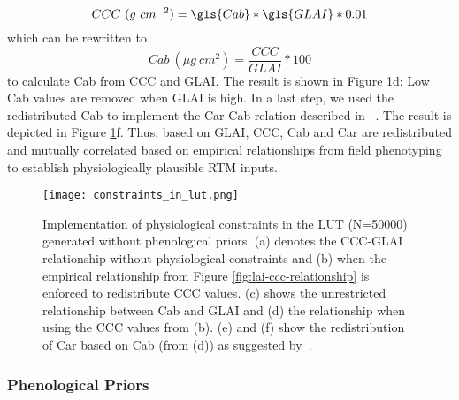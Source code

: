 \begin{equation}
\label{eq:ccc-calc-rtm}
    CCC\ (g\ cm^{-2}) = \gls{Cab} * \gls{GLAI} * 0.01
\end{equation}
which can be rewritten to
\begin{equation}
\label{eq:ccc-calc-rtm_inv}
    Cab\ (\mu g\ cm^{2}) = \frac{CCC}{GLAI} * 100
\end{equation}
to calculate \gls{Cab} from \gls{CCC} and GLAI. The result is shown in Figure \ref{fig:constraints-in-lut}d: Low \gls{Cab} values are removed when \gls{GLAI} is high. In a last step, we used the redistributed \gls{Cab} to implement the Car-Cab relation described in ~\cite{wocher_rtm-based_2020}. The result is depicted in Figure \ref{fig:constraints-in-lut}f. Thus, based on GLAI, CCC, \gls{Cab} and Car are redistributed and mutually correlated based on empirical relationships from field phenotyping to establish physiologically plausible \gls{RTM} inputs.

\begin{figure}[H]
    \centering
    \texttt{[image: constraints\_in\_lut.png]}
    \caption[Implementation of physiological constraints in the \gls{LUT} (N=50000) generated without phenological priors. (a) denotes the CCC-GLAI relationship without physiological constraints and (b) when the empirical relationship from Figure \ref{fig:lai-ccc-relationship} is enforced to redistribute \gls{CCC} values. (c) shows the unrestricted relationship between \gls{Cab} and \gls{GLAI} and (d) the relationship when using the \gls{CCC} values from (b). (e) and (f) show the redistribution of Car based on \gls{Cab} (from (d)) as suggested by~\cite{wocher_rtm-based_2020}.]{Implementation of physiological constraints in the \gls{LUT} (N=50000) generated without phenological priors. (a) denotes the CCC-GLAI relationship without physiological constraints and (b) when the empirical relationship from Figure \ref{fig:lai-ccc-relationship} is enforced to redistribute \gls{CCC} values. (c) shows the unrestricted relationship between \gls{Cab} and \gls{GLAI} and (d) the relationship when using the \gls{CCC} values from (b). (e) and (f) show the redistribution of Car based on \gls{Cab} (from (d)) as suggested by~\cite{wocher_rtm-based_2020}.}
    \label{fig:constraints-in-lut}
\end{figure}


\subsubsection{Phenological Priors}
\label{subsubsec:phenological-constraints}
